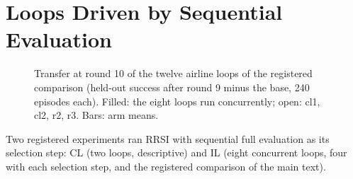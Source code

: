 \documentclass[11pt]{article}
\begin{document}
\begin{table}[t]
\centering\footnotesize
\setlength{\tabcolsep}{3pt}
\caption{Decision values by domain and stage (post hoc): rounds ($n$), full evaluation's acceptances (Acc.), its decision value $D$ and the sequential rule's difference from it, in points per round with 90\% block-bootstrap intervals, the rule's recall of full evaluation's acceptances (\%), the expected number of acceptances it drops (Drop.) and their mean held-out gain in points (Gain; where it drops at least half an acceptance). The pooled rows use a separate bootstrap draw from Table~\ref*{M-tab:primary}'s, so their intervals differ slightly ($[-0.38,+0.41]$ against $[-0.35,+0.43]$ for $D$(full) on r2+r3).}
\label{tab:cells}
\end{table}

\section{Loops Driven by Sequential Evaluation}
\label{app:cl}

\begin{figure}[t]
\centering
{}
\caption{Transfer at round 10 of the twelve airline loops of the registered comparison (held-out success after round 9 minus the base, 240 episodes each). Filled: the eight loops run concurrently; open: cl1, cl2, r2, r3. Bars: arm means.}
\label{fig:il}
\end{figure}


Two registered experiments ran RRSI with sequential full evaluation as its selection step: CL (two loops, descriptive) and IL (eight concurrent loops, four with each selection step, and the registered comparison of the main text).
\end{document}

